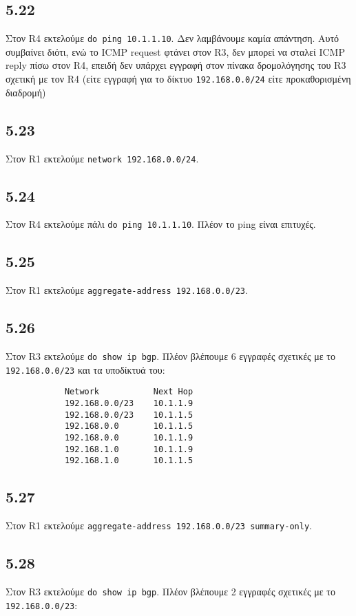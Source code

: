 \documentclass[a4paper, 12pt]{article}
\begin{document}
	\subsection*{5.22}
		Στον R4 εκτελούμε \verb|do ping 10.1.1.10|. Δεν λαμβάνουμε καμία απάντηση. Αυτό συμβαίνει διότι, ενώ το ICMP request φτάνει στον R3, δεν μπορεί να σταλεί ICMP reply πίσω στον R4, επειδή δεν υπάρχει εγγραφή στον πίνακα δρομολόγησης του R3 σχετική με τον R4 (είτε εγγραφή για το δίκτυο \verb|192.168.0.0/24| είτε προκαθορισμένη διαδρομή)

	\subsection*{5.23}
		Στον R1 εκτελούμε \verb|network 192.168.0.0/24|. 

	\subsection*{5.24}
		Στον R4 εκτελούμε πάλι \verb|do ping 10.1.1.10|. Πλέον το ping είναι επιτυχές.

	\subsection*{5.25}
		Στον R1 εκτελούμε \verb|aggregate-address 192.168.0.0/23|.

	\subsection*{5.26}
		Στον R3 εκτελούμε \verb|do show ip bgp|. Πλέον βλέπουμε 6 εγγραφές σχετικές με το \verb|192.168.0.0/23| και τα υποδίκτυά του:
		
		\begin{verbatim}
			Network           Next Hop
			192.168.0.0/23    10.1.1.9
			192.168.0.0/23    10.1.1.5
			192.168.0.0       10.1.1.5
			192.168.0.0       10.1.1.9
			192.168.1.0       10.1.1.9
			192.168.1.0       10.1.1.5
		\end{verbatim}

	\subsection*{5.27}
		Στον R1 εκτελούμε \verb|aggregate-address 192.168.0.0/23 summary-only|. 

	\subsection*{5.28}
		Στον R3 εκτελούμε \verb|do show ip bgp|. Πλέον βλέπουμε 2 εγγραφές σχετικές με το \verb|192.168.0.0/23|:
		
\end{document}
